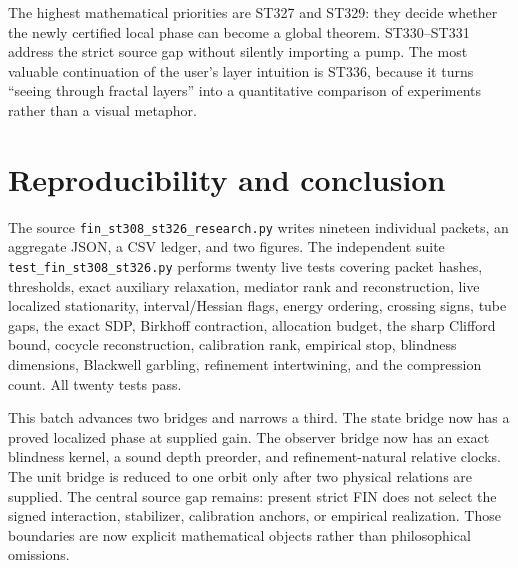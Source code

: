 \documentclass[11pt,a4paper]{article}
\begin{document}
The highest mathematical priorities are ST327 and ST329: they decide whether the newly
certified local phase can become a global theorem. ST330--ST331 address the strict source
gap without silently importing a pump. The most valuable continuation of the user's layer
intuition is ST336, because it turns ``seeing through fractal layers'' into a quantitative
comparison of experiments rather than a visual metaphor.

\section{Reproducibility and conclusion}

The source \texttt{fin\_st308\_st326\_research.py} writes nineteen individual packets, an
aggregate JSON, a CSV ledger, and two figures. The independent suite
\texttt{test\_fin\_st308\_st326.py} performs twenty live tests covering packet hashes,
thresholds, exact auxiliary relaxation, mediator rank and reconstruction, live localized
stationarity, interval/Hessian flags, energy ordering, crossing signs, tube gaps, the exact
SDP, Birkhoff contraction, allocation budget, the sharp Clifford bound, cocycle
reconstruction, calibration rank, empirical stop, blindness dimensions, Blackwell
garbling, refinement intertwining, and the compression count. All twenty tests pass.

This batch advances two bridges and narrows a third. The state bridge now has a proved
localized phase at supplied gain. The observer bridge now has an exact blindness kernel,
a sound depth preorder, and refinement-natural relative clocks. The unit bridge is reduced
to one orbit only after two physical relations are supplied. The central source gap remains:
present strict FIN does not select the signed interaction, stabilizer, calibration anchors,
or empirical realization. Those boundaries are now explicit mathematical objects rather
than philosophical omissions.
\end{document}
